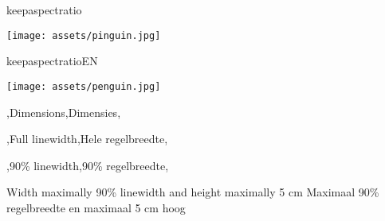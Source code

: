 \begin{saveblock}{keepaspectratio}
	\begin{highlightblock}[gobble=8]
		\texttt{[image: assets/pinguin.jpg]}
	\end{highlightblock}
\end{saveblock}

\begin{saveblock}{keepaspectratioEN}
	\begin{highlightblock}[gobble=8]
		\texttt{[image: assets/penguin.jpg]}
	\end{highlightblock}
\end{saveblock}


\begin{frame}{\lang,Dimensions,Dimensies,}
	\begin{noindentlist}\setlength{\itemsep}{20pt}
		\item \lang,Full linewidth,Hele regelbreedte,\\
		
		
		\item \lang,90\% linewidth,90\% regelbreedte,\\
		
		\item \lang
		{Width maximally 90\% linewidth and height maximally 5 cm}
		{Maximaal 90\% regelbreedte en maximaal 5 cm hoog}
	\end{noindentlist}
\end{frame}
